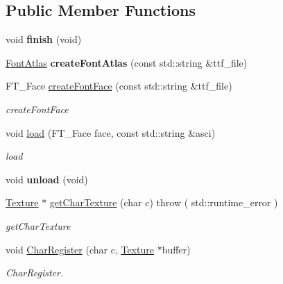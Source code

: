 \subsection*{Public Member Functions}
\begin{DoxyCompactItemize}
\item 
\hypertarget{classEngine_1_1FontManager_aef1290f13e68f6c22fe5a9341bf04de9}{}void {\bfseries finish} (void)\label{classEngine_1_1FontManager_aef1290f13e68f6c22fe5a9341bf04de9}

\item 
\hypertarget{classEngine_1_1FontManager_ab6edb246a77230f5ef25ea065ce9bd8f}{}\hyperlink{structEngine_1_1FontAtlas}{Font\+Atlas} {\bfseries create\+Font\+Atlas} (const std\+::string \&ttf\+\_\+file)\label{classEngine_1_1FontManager_ab6edb246a77230f5ef25ea065ce9bd8f}

\item 
F\+T\+\_\+\+Face \hyperlink{classEngine_1_1FontManager_a6e6afb29d8dde70cfd44a9a062a70e5b}{create\+Font\+Face} (const std\+::string \&ttf\+\_\+file)
\begin{DoxyCompactList}\small\item\em create\+Font\+Face \end{DoxyCompactList}\item 
void \hyperlink{classEngine_1_1FontManager_a25e57a935eaa136bdca2aa477d6f0bbf}{load} (F\+T\+\_\+\+Face face, const std\+::string \&asci)
\begin{DoxyCompactList}\small\item\em load \end{DoxyCompactList}\item 
\hypertarget{classEngine_1_1FontManager_abef4ff92e3d53fc92785680af0e017b4}{}void {\bfseries unload} (void)\label{classEngine_1_1FontManager_abef4ff92e3d53fc92785680af0e017b4}

\item 
\hyperlink{classEngine_1_1Texture}{Texture} $\ast$ \hyperlink{classEngine_1_1FontManager_a4ae277341d1f3b33dfab74ab2f175587}{get\+Char\+Texture} (char c)  throw ( std\+::runtime\+\_\+error )
\begin{DoxyCompactList}\small\item\em get\+Char\+Texture \end{DoxyCompactList}\item 
void \hyperlink{classEngine_1_1FontManager_aa036cdf0c0646b46069eb18732d81f00}{Char\+Register} (char c, \hyperlink{classEngine_1_1Texture}{Texture} $\ast$buffer)
\begin{DoxyCompactList}\small\item\em Char\+Register. \end{DoxyCompactList}\end{DoxyCompactItemize}
